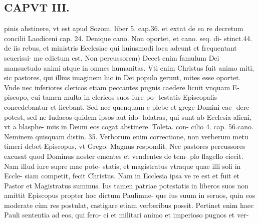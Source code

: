 \documentclass{article}
\begin{document}
\begin{pages}
\section*{CAPVT  III. }
\marginpar{[ p.133 ]}\pstart pinis abstinere, vt est apud Sozom. liber 5. cap.36. et extat de ea re decretum concilii Laodiceni cap. 24. Denique cano. Non oportet, et cano. seq. di- stinct.44. de iis rebus, et ministris Ecclesiae qui huiusmodi loca adeunt et frequentant seuerissi- me edictum est.  \pend\pstart Non percussorem) Decet enim famulum Dei mansuetudo animi atque in omnes humanitas. Vti enim Christus fuit animo miti, sic pastores, qui illius imaginem hic in Dei populo gerunt, mites esse oportet. Vnde nec inferiores clericos etiam peccantes pugnis caedere licuit vnquam E- piscopo, cui tamen multa in clericos suos iure po- testatis Episcopalis concedebantur et licebant. Sed nec quenquam e plebe et grege Domini cae- dere potest, sed ne Iudaeos quidem ipsos aut ido- lolatras, qui sunt ab Ecclesia alieni, vt a blasphe- miis in Deum eos cogat abstinere. Toleta. con- cilio 4. cap. 56.cano. Neminem quisquam distin. 35. Verborum enim correctione, non verberum metu timeri debet Episcopus, vt Grego. Magnus respondit. Nec pastores percussores excusat quod Dominus noster ementes et vendentes de tem- plo flagello eiecit. Nam illud iure supre mae pote- statis, et magistratus vtraque  quae illi soli in Eccle- siam competit, fecit Christus. Nam in Ecclesia ipsa ve re est et fuit et Pastor et Magistratus summus. Ius tamen patriae potestatis in liberos suos non amittit Episcopus propter hoc dictum Paulimne- que ius suum in seruos, quin eos moderate cùm res postulat, castigare etiam verberibus possit. Pertinet enim haec Pauli sententia ad eos, qui fero- ci et militari animo et imperioso pugnos et ver-  \pend

\end{pages}
\end{document}
